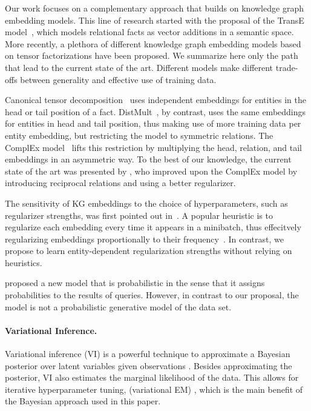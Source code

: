 \documentclass[letterpage]{article}
\begin{document}
Our work focuses on a complementary approach that builds on knowledge graph embedding models.
This line of research started with the proposal of the TransE model~\citep{BUGWY2013}, which models relational facts as vector additions in a semantic space.
More recently, a plethora of different knowledge graph embedding models based on tensor factorizations have been proposed.
We summarize here only the path that lead to the current state of the art.
Different models make different trade-offs between generality and effective use of training data.

Canonical tensor decomposition~\citep{H1927} uses independent embeddings for entities in the head or tail position of a fact.
DistMult~\citep{BWXJL2015,TC2015}, by contrast, uses the same embeddings for entities in head and tail position, thus making use of more training data per entity embedding, but restricting the model to symmetric relations.
The ComplEx model~\citep{TWR2016} lifts this restriction by multiplying the head, relation, and tail embeddings in an asymmetric way.
To the best of our knowledge, the current state of the art was presented by \citet{LUO2018}, who improved upon the ComplEx model by introducing reciprocal relations and using a better regularizer.

The sensitivity of KG embeddings to the choice of hyperparameters, such as regularizer strengths, was first pointed out in~\citep{KBK2017}.
A popular heuristic is to regularize each embedding every time it appears in a minibatch, thus effecitvely regularizing embeddings proportionally to their frequency~\citep{SS2010,LUO2018}.
In contrast, we propose to learn entity-dependent regularization strengths without relying on heuristics.

\cite{vilnis2018probabilistic} proposed a new model that is probabilistic in the sense that it assigns probabilities to the results of queries.
However, in contrast to our proposal, the model is not a probabilistic generative model of the data set.

\paragraph{Variational Inference.} Variational inference (VI) is a powerful technique to approximate a Bayesian posterior over latent variables given observations \citep{JGJS1999,BKM2017,ZBKM2017}. Besides approximating the posterior, VI also estimates the marginal likelihood of the data. This allows for iterative hyperparameter tuning, (variational EM) \citep{bernardo2003variational}, which is the main benefit of the Bayesian approach used in this paper.
\end{document}
